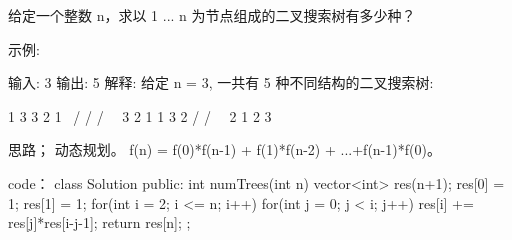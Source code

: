 给定一个整数 n，求以 1 ... n 为节点组成的二叉搜索树有多少种？

示例:

输入: 3
输出: 5
解释:
给定 n = 3, 一共有 5 种不同结构的二叉搜索树:

   1         3     3      2      1
    \       /     /      / \      \
     3     2     1      1   3      2
    /     /       \                 \
   2     1         2                 3


























思路；
动态规划。
f(n) = f(0)*f(n-1) + f(1)*f(n-2) + ...+f(n-1)*f(0)。






























code：
class Solution {
public:
    int numTrees(int n) {
        vector<int> res(n+1);
        res[0] = 1;
        res[1] = 1;
        for(int i = 2; i <= n; i++)
        {
            for(int j = 0; j < i; j++)
            {
                res[i] += res[j]*res[i-j-1];
            }
        }
        return res[n];
    }
};